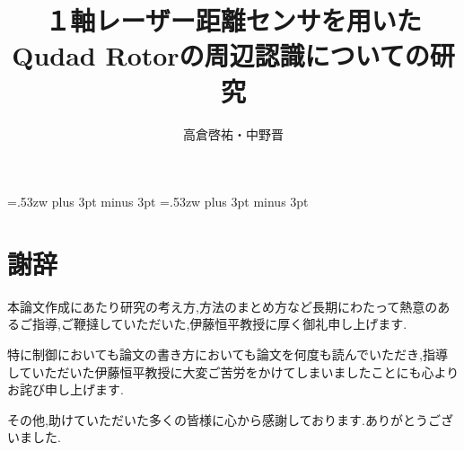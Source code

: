 \documentclass[12pt,oneside]{paper}
\title{１軸レーザー距離センサを用いたQudad Rotorの周辺認識についての研究}
\author{高倉啓祐・中野晋}
\begin{document}
\setlength{\baselineskip}{9truemm}

\kanjiskip=.53zw plus 3pt minus 3pt
\xkanjiskip=.53zw plus 3pt minus 3pt

\tableofcontents

















\chapter*{謝辞}
本論文作成にあたり研究の考え方,方法のまとめ方など長期にわたって熱意のあるご指導,ご鞭撻していただいた,伊藤恒平教授に厚く御礼申し上げます.

特に制御においても論文の書き方においても論文を何度も読んでいただき,指導していただいた伊藤恒平教授に大変ご苦労をかけてしまいましたことにも心よりお詫び申し上げます.

その他,助けていただいた多くの皆様に心から感謝しております.ありがとうございました.

\appendix

\end{document}
